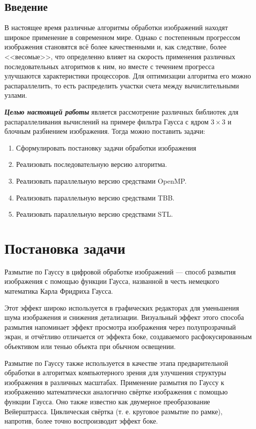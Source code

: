 \documentclass[12pt]{article}
\begin{document}
    \tableofcontents %

\newpage
\begin{center}
\section*{Введение}
\end{center}
\par
В настоящее время различные алгоритмы обработки изображений находят широкое применение в современном мире. Однако с постепенным прогрессом изображения становятся всё более качественными и, как следствие, более <<весомые>>, что определенно влияет на скорость применения различных последовательных алгоритмов к ним, но вместе с течением прогресса улучшаются характеристики процессоров. Для оптимизации алгоритма его можно распараллелить, то есть распределить участки счета между вычислительными узлами.
\par
\textit{\textbf{Целью настоящей работы}} является рассмотрение различных библиотек для распараллеливания вычислений на примере фильтра Гаусса с ядром $3 \times 3$ и блочным разбиением изображения. Тогда можно поставить задачи:
\begin{enumerate}
	\item Сформулировать постановку задачи обработки изображения
	\item Реализовать последовательную версию алгоритма.
	\item Реализовать параллельную версию средствами OpenMP.
	\item Реализовать параллельную версию средствами TBB.
	\item Реализовать параллельную версию средствами STL.
\end{enumerate}

\newpage
\section{Постановка задачи}
\par
Размытие по Гауссу в цифровой обработке изображений — способ размытия изображения с помощью функции Гаусса, названной в честь немецкого математика Карла Фридриха Гаусса.
\par
Этот эффект широко используется в графических редакторах для уменьшения шума изображения и снижения детализации. Визуальный эффект этого способа размытия напоминает эффект просмотра изображения через полупрозрачный экран, и отчётливо отличается от эффекта боке, создаваемого расфокусированным объективом или тенью объекта при обычном освещении.
\par
Размытие по Гауссу также используется в качестве этапа предварительной обработки в алгоритмах компьютерного зрения для улучшения структуры изображения в различных масштабах.
Применение размытия по Гауссу к изображению математически аналогично свёртке изображения с помощью функции Гаусса. Оно также известно как двумерное преобразование Вейерштрасса. Циклическая свёртка (т. е. круговое размытие по рамке), напротив, более точно воспроизводит эффект боке.
\end{document}
